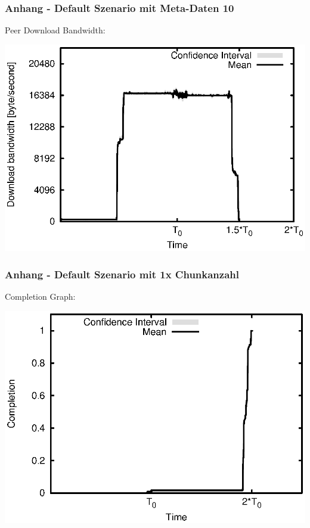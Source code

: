 \begin{frame}
  \frametitle{Anhang - Default Szenario mit Meta-Daten 10}
  Peer Download Bandwidth:
  
  \begin{center}
    \includegraphics[width=1\textwidth]{fig/plots/scenario_10_meta_data_10/plots/GeneratedMeanCurrentDownloadBandwidth.csv.eps}
  \end{center}
\end{frame}


\begin{frame}
  \frametitle{Anhang - Default Szenario mit 1x Chunkanzahl}
  Completion Graph:
  
  \begin{center}
    \includegraphics[width=1\textwidth]{fig/plots/scenario_7_chunk_count_fac_1/plots/GeneratedMeanChunkCompletion.csv.eps}
  \end{center}
\end{frame}



